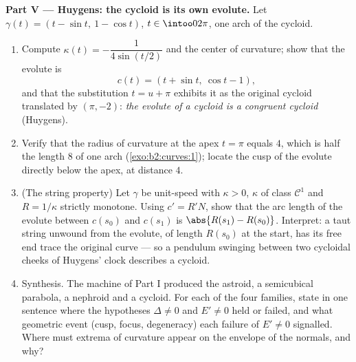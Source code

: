 \begin{problem}
\medskip
\noindent\textbf{Part V --- Huygens: the cycloid is its own
evolute.} Let $\gamma(t) = (t - \sin t,\ 1 - \cos t)$, $t \in
\intoo0{2\pi}$, one arch of the cycloid.
\begin{enumerate}[resume]
  \item Compute $\kappa(t) = -\dfrac1{4\sin(t/2)}$ and the
        center of curvature; show that the evolute is
        \[
        c(t) = (t + \sin t,\ \cos t - 1),
        \]
        and that the substitution $t = u + \pi$ exhibits it
        as the original cycloid translated by $(\pi, -2)$:
        \emph{the evolute of a cycloid is a congruent
        cycloid} (Huygens).
  \item Verify that the radius of curvature at the apex $t =
        \pi$ equals $4$, which is half the length $8$ of one
        arch (\cref{exo:b2:curves:1}); locate the cusp of the
        evolute directly below the apex, at distance $4$.
  \item (The string property) Let $\gamma$ be unit-speed with
        $\kappa > 0$, $\kappa$ of class $\mathcal C^1$ and
        $R = 1/\kappa$ strictly monotone. Using $c' = R'N$,
        show that the arc length of the evolute between
        $c(s_0)$ and $c(s_1)$ is $\abs{R(s_1) - R(s_0)}$.
        Interpret: a taut string unwound from the evolute,
        of length $R(s_0)$ at the start, has its free end
        trace the original curve --- so a pendulum swinging
        between two cycloidal cheeks of Huygens' clock
        describes a cycloid.
  \item Synthesis. The machine of Part I produced the
        astroid, a semicubical parabola, a nephroid and a
        cycloid. For each of the four families, state in one
        sentence where the hypotheses $\Delta \neq 0$ and
        $E' \neq 0$ held or failed, and what geometric event
        (cusp, focus, degeneracy) each failure of $E' \neq 0$
        signalled. Where must extrema of curvature appear on
        the envelope of the normals, and why?
\end{enumerate}
\end{problem}
